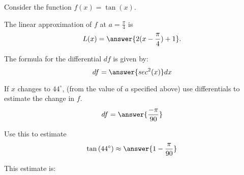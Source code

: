 \documentclass{ximera}
\author{Bobby Ramsey}
\begin{document}
\begin{exercise}

	Consider the function $f(x) = \tan(x)$.

	The linear approximation of $f$ at $a=\frac{\pi}{4}$ is 
	\[ L(x) = \answer{2(x-\frac{\pi}{4})+1}. \]

	\begin{exercise}
		The formula for the differential $df$ is given by:
		\[ df = \answer{sec^2(x)} dx \]					
		
		\begin{exercise}
			If $x$ changes to $44^\circ$, (from the value of $a$ specified above) use differentials to estimate the change in $f$.
			\[ df = \answer{\frac{-\pi}{90}} \]
			
			\begin{exercise}
				Use this to estimate \[\tan\left( 44^\circ \right) \approx \answer{1-\frac{\pi}{90}} \]
				
				\begin{exercise}
					This estimate is:
					\begin{multipleChoice}
					\end{multipleChoice}
				\end{exercise}
			\end{exercise}
		\end{exercise}
	\end{exercise}
\end{exercise}
\end{document}
